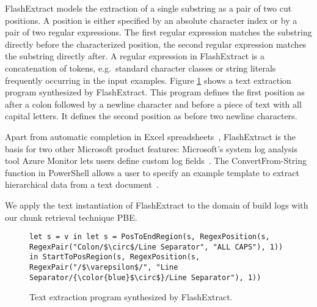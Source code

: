 FlashExtract models the extraction of a single substring as a pair of
two cut positions. A position is either specified by an absolute
character index or by a pair of two regular expressions. The first
regular expression matches the substring directly before the
characterized position, the second regular expression matches the
substring directly after. A regular expression in FlashExtract is a
concatenation of tokens, e.g.\ standard character classes or string
literals frequently occurring in the input examples. Figure
\ref{lst:prose-program} shows a text extraction program synthesized by
FlashExtract. This program defines the first position as after a colon
followed by a newline character and before a piece of text with all
capital letters. It defines the second position as before two newline
characters.

Apart from automatic completion in Excel
spreadsheets~\cite{excel2019flashfill}, FlashExtract is the basis for
two other Microsoft product features: Microsoft's system log analysis
tool Azure Monitor lets users define custom log
fields~\cite{azure2019custom}. The ConvertFrom-String function in
PowerShell allows a user to specify an example template to extract
hierarchical data from a text document~\cite{powershell2019convert}.

We apply the text instantiation of FlashExtract to the domain of build
logs with our chunk retrieval technique PBE\@.

\begin{figure}[!t]
  \centering
  \begin{lstlisting}[breaklines=true]
let s = v in let s = PosToEndRegion(s, RegexPosition(s, RegexPair("Colon/$\circ$/Line Separator", "ALL CAPS"), 1)) in StartToPosRegion(s, RegexPosition(s, RegexPair("/$\varepsilon$/", "Line Separator/{\color{blue}$\circ$}/Line Separator"), 1))
  \end{lstlisting}  
  \caption{Text extraction program synthesized by FlashExtract.}
  \label{lst:prose-program}
\end{figure}
